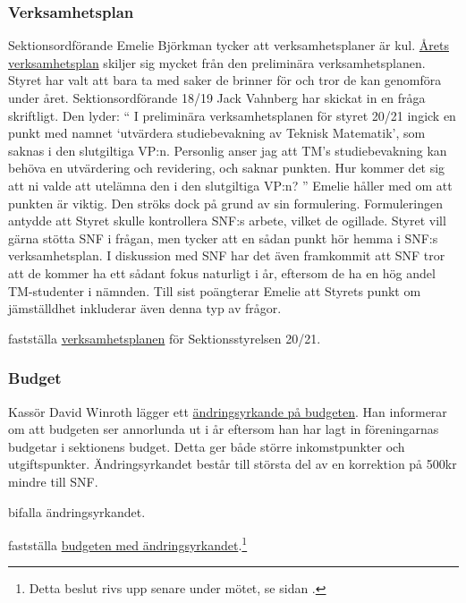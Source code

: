 \documentclass[hidelinks]{sektionsmote}
\begin{document}
\subsubsection{Verksamhetsplan}
Sektionsordförande Emelie Björkman tycker att verksamhetsplaner är kul.
\hyperlink{bilagor/styret/vp.pdf.1}{Årets verksamhetsplan} skiljer sig mycket från den preliminära verksamhetsplanen.
Styret har valt att bara ta med saker de brinner för och tror de kan genomföra under året.
Sektionsordförande 18/19 Jack Vahnberg har skickat in en fråga skriftligt.
Den lyder:
\enquote{%
    I preliminära verksamhetsplanen för styret 20/21 ingick en punkt med namnet \enquote{utvärdera studiebevakning av Teknisk Matematik}, som saknas i den slutgiltiga VP:n.
    Personlig anser jag att TM's studiebevakning kan behöva en utvärdering och revidering, och saknar punkten.
    Hur kommer det sig att ni valde att utelämna den i den slutgiltiga VP:n?%
}
Emelie håller med om att punkten är viktig.
Den ströks dock på grund av sin formulering.
Formuleringen antydde att Styret skulle kontrollera SNF:s arbete, vilket de ogillade.
Styret vill gärna stötta SNF i frågan, men tycker att en sådan punkt hör hemma i SNF:s verksamhetsplan.
I diskussion med SNF har det även framkommit att SNF tror att de kommer ha ett sådant fokus naturligt i år, eftersom de ha en hög andel TM-studenter i nämnden.
Till sist poängterar Emelie att Styrets punkt om jämställdhet inkluderar även denna typ av frågor.
\begin{beslut}
    \item fastställa \hyperlink{bilagor/styret/vp.pdf.1}{verksamhetsplanen} för Sektionsstyrelsen 20/21.
\end{beslut}

\subsubsection{Budget}
Kassör David Winroth lägger ett \hyperlink{bilagor/styret/ny-budget.pdf.1}{ändringsyrkande på budgeten}.
Han informerar om att budgeten ser annorlunda ut i år eftersom han har lagt in föreningarnas budgetar i sektionens budget.
Detta ger både större inkomstpunkter och utgiftspunkter.
Ändringsyrkandet består till största del av en korrektion på 500kr mindre till SNF.
\begin{beslut}
    \item bifalla ändringsyrkandet.
    \item fastställa \hyperlink{bilagor/styret/ny-budget.pdf.1}{budgeten med ändringsyrkandet}.\footnote{Detta beslut rivs upp senare under mötet, se sidan \pageref{uppriven-budget}.}\label{budget-orginalbeslut}
\end{beslut}
\end{document}
